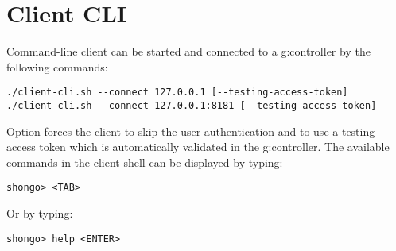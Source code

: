 \section{Client CLI}
Command-line client can be started and connected to a \gls{g:controller} by the following commands:
\begin{verbatim}
./client-cli.sh --connect 127.0.0.1 [--testing-access-token]
./client-cli.sh --connect 127.0.0.1:8181 [--testing-access-token]
\end{verbatim}
Option  forces the client to skip the user authentication and to use a testing access token which is automatically validated in the \gls{g:controller}.
The available commands in the client shell can be displayed by typing:
\begin{verbatim}
shongo> <TAB>
\end{verbatim}
Or by typing:
\begin{verbatim}
shongo> help <ENTER>
\end{verbatim}


